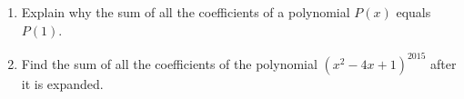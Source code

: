 \begin{enumerate}
\item[(a)] Explain why the sum of all the coefficients of a polynomial $P(x)$ equals $P(1)$.
\item[(b)] Find the sum of all the coefficients of the polynomial $\left(x^2-4x+1\right)^{2015}$ after it is expanded.
\end{enumerate}
